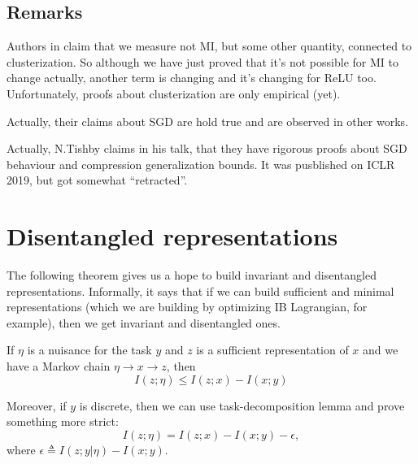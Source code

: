 \documentclass{article}
\begin{document}
\subsection{Remarks}
\begin{remark}
Authors in \cite{Estimating_MI_in_NNs} claim that we measure not MI, but some other quantity, connected to clusterization.
So although we have just proved that it's not possible for MI to change actually, another term is changing and it's changing for ReLU too.
Unfortunately, proofs about clusterization are only empirical (yet).
\end{remark}

\begin{remark}
Actually, their claims about SGD are hold true and are observed in other works.
\end{remark}

\begin{remark}
Actually, N.Tishby claims in his talk, that they have rigorous proofs about SGD behaviour and compression generalization bounds.
It was pusblished on ICLR 2019, but got somewhat ``retracted''.
\end{remark}


\section{Disentangled representations}

The following theorem gives us a hope to build invariant and disentangled representations.
Informally, it says that if we can build sufficient and minimal representations (which we are building by optimizing IB Lagrangian, for example), then we get invariant and disentangled ones.

\begin{proposition}
If $\eta$ is a nuisance for the task $y$ and $z$ is a sufficient representation of $x$ and we have a Markov chain $\eta \to x \to z$, then
\[
I(z;\eta) \leq I(z;x) - I(x;y)
\]

Moreover, if $y$ is discrete, then we can use task-decomposition lemma and prove something more strict:
\[
I(z;\eta) = I(z;x) - I(x;y) - \epsilon,
\]
where $\epsilon \triangleq I(z; y|\eta) - I(x;y)$.
\end{proposition}
\end{document}
